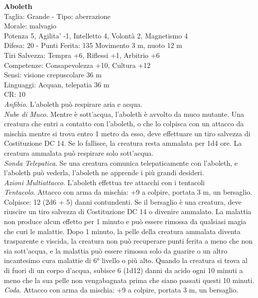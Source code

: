 \begin{multicols}{2}
\textbf{Aboleth}\\
Taglia: Grande - \hspace*{0pt}\hfill{Tipo: aberrazione}\\
Morale: malvagio\\
Potenza 5, Agilita' -1, Intelletto 4, Volontà 2, Magnetismo 4\\
Difesa: 20 - \hspace*{0pt}\hfill{Punti Ferita: 135}
Movimento 3 m, nuoto 12 m\\
Tiri Salvezza: Tempra +6, Riflessi +1, Arbitrio +6\\
Competenze: Consapevolezza +10, Cultura +12\\
Sensi: visione crepuscolare 36 m\\
Linguaggi: Acquan, telepatia 36 m\\
CR: 10\\
\textit{Anfibio}. L’aboleth può respirare aria e acqua.\\
\textit{Nube di Muco}. Mentre è sott’acqua, l’aboleth è avvolto da muco mutante. Una creatura che entri a contatto con l’aboleth, o che lo colpisca con un attacco da mischia mentre si trova entro 1 metro da esso, deve effettuare un tiro salvezza di Costituzione DC 14. Se lo fallisce, la creatura resta ammalata per 1d4 ore. La creatura ammalata può respirare solo sott’acqua.\\
\textit{Sonda Telepatica}. Se una creatura comunica telepaticamente con  l’aboleth, e l’aboleth può vederla, l’aboleth ne apprende i più grandi desideri.\\
\textit{Azioni Multiattacco}. L’aboleth effettua tre attacchi con i tentacoli\\
\textit{Tentacolo}. Attacco con arma da mischia: +9 a colpire, portata 3 m, un bersaglio.
Colpisce: 12 (2d6 + 5) danni contundenti. Se il bersaglio è una creatura, deve riuscire un tiro salvezza di Costituzione DC 14 o divenire ammalato. La malattia non produce alcun effetto per 1 minuto e può essere rimossa da qualsiasi magia che curi le malattie. Dopo 1 minuto, la pelle della creatura ammalata diventa trasparente e viscida, la creatura non può recuperare punti ferita a meno che non sia sott’acqua, e la malattia può essere rimossa solo da guarire o un altro incantesimo cura malattie di 6° livello o più alto. Quando la creatura si trova al di fuori di un corpo d’acqua, subisce 6 (1d12) danni da acido ogni 10 minuti a meno che la sua pelle non vengabagnata prima che siano passati questi  10 minuti.\\
\textit{Coda}. Attacco con arma da mischia: +9 a colpire, portata 3 m, un bersaglio.

\end{multicols}
